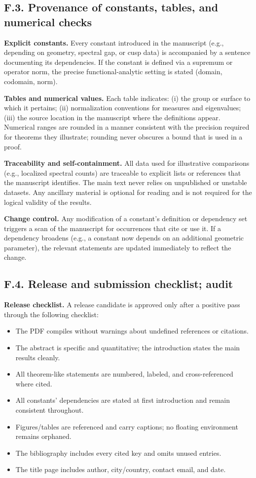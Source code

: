 \subsection*{F.3. Provenance of constants, tables, and numerical checks}

\noindent \textbf{Explicit constants.}
Every constant introduced in the manuscript (e.g., depending on geometry, spectral gap, or cusp data) is accompanied by a sentence documenting its dependencies. If the constant is defined via a supremum or operator norm, the precise functional-analytic setting is stated (domain, codomain, norm).

\medskip
\noindent \textbf{Tables and numerical values.}
Each table indicates: (i) the group or surface to which it pertains; (ii) normalization conventions for measures and eigenvalues; (iii) the source location in the manuscript where the definitions appear. Numerical ranges are rounded in a manner consistent with the precision required for theorems they illustrate; rounding never obscures a bound that is used in a proof.

\medskip
\noindent \textbf{Traceability and self-containment.}
All data used for illustrative comparisons (e.g., localized spectral counts) are traceable to explicit lists or references that the manuscript identifies. The main text never relies on unpublished or unstable datasets. Any ancillary material is optional for reading and is not required for the logical validity of the results.

\medskip
\noindent \textbf{Change control.}
Any modification of a constant’s definition or dependency set triggers a scan of the manuscript for occurrences that cite or use it. If a dependency broadens (e.g., a constant now depends on an additional geometric parameter), the relevant statements are updated immediately to reflect the change.

\subsection*{F.4. Release and submission checklist; audit}

\noindent \textbf{Release checklist.}
A release candidate is approved only after a positive pass through the following checklist:
\begin{itemize}
  \item The PDF compiles without warnings about undefined references or citations.
  \item The abstract is specific and quantitative; the introduction states the main results cleanly.
  \item All theorem-like statements are numbered, labeled, and cross-referenced where cited.
  \item All constants’ dependencies are stated at first introduction and remain consistent throughout.
  \item Figures/tables are referenced and carry captions; no floating environment remains orphaned.
  \item The bibliography includes every cited key and omits unused entries.
  \item The title page includes author, city/country, contact email, and date.
\end{itemize}

